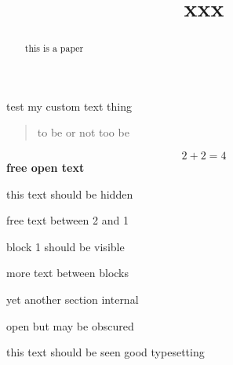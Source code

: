 \documentclass[aps,secnumarabic,balancelastpage,amsmath,amssymb,nofootinbib]{revtex4-2}
\begin{document}
\title{xxx}{ test my custom text thing}
\begin{abstract}
{ this is a paper }

\end{abstract}



\begin{quote}
to be or not too be 
\end{quote}
\begin{equation}
2+2=4
\end{equation}
\large
\bf
free open text 



this text should be  hidden 


free text between 2 and 1 


block 1 should be visible 


more text between blocks 



yet another section internal 
 

open but may be obscured 

this text should be seen good typesetting
\end{document}
